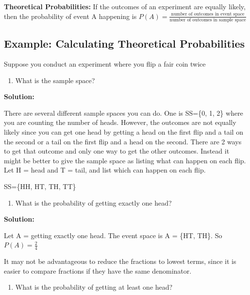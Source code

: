 \documentclass[]{book}
\providecommand{\tightlist}{%
  \setlength{\itemsep}{0pt}\setlength{\parskip}{0pt}}
\begin{document}
\textbf{Theoretical Probabilities:} If the outcomes of an experiment are equally likely, then the probability of event A happening is \(P(A)=\frac{\text{number of outcomes in event space}}{\text{number of outcomes in sample space}}\)

\hypertarget{example-calculating-theoretical-probabilities}{%
\subsection{Example: Calculating Theoretical Probabilities}\label{example-calculating-theoretical-probabilities}}

Suppose you conduct an experiment where you flip a fair coin twice

\begin{enumerate}
\def\labelenumi{\alph{enumi}.}
\tightlist
\item
  What is the sample space?
\end{enumerate}

\textbf{Solution:}

There are several different sample spaces you can do. One is SS=\{0, 1, 2\} where you are counting the number of heads. However, the outcomes are not equally likely since you can get one head by getting a head on the first flip and a tail on the second or a tail on the first flip and a head on the second. There are 2 ways to get that outcome and only one way to get the other outcomes. Instead it might be better to give the sample space as listing what can happen on each flip. Let H = head and T = tail, and list which can happen on each flip.

SS=\{HH, HT, TH, TT\}

\begin{enumerate}
\def\labelenumi{\alph{enumi}.}
\setcounter{enumi}{1}
\tightlist
\item
  What is the probability of getting exactly one head?
\end{enumerate}

\textbf{Solution:}

Let A = getting exactly one head. The event space is A = \{HT, TH\}. So \(P(A)=\frac{2}{4}\)

It may not be advantageous to reduce the fractions to lowest terms,
since it is easier to compare fractions if they have the same
denominator.

\begin{enumerate}
\def\labelenumi{\alph{enumi}.}
\setcounter{enumi}{2}
\tightlist
\item
  What is the probability of getting at least one head?
\end{enumerate}
\end{document}
